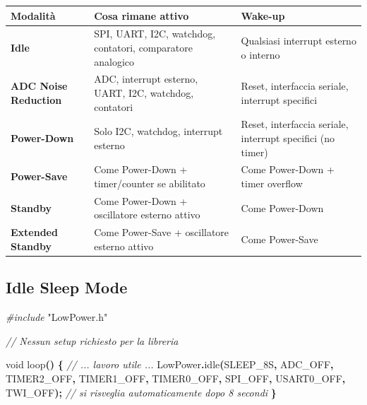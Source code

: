 \documentclass[
  italian,
  openany]{book}
\newenvironment{Shaded}{\begin{snugshade}}{\end{snugshade}}
\newcommand{\CommentTok}[1]{\textcolor[rgb]{0.56,0.35,0.01}{\textit{#1}}}
\newcommand{\DataTypeTok}[1]{\textcolor[rgb]{0.13,0.29,0.53}{#1}}
\newcommand{\ImportTok}[1]{#1}
\newcommand{\NormalTok}[1]{#1}
\newcommand{\OperatorTok}[1]{\textcolor[rgb]{0.81,0.36,0.00}{\textbf{#1}}}
\newcommand{\PreprocessorTok}[1]{\textcolor[rgb]{0.56,0.35,0.01}{\textit{#1}}}
\newcounter{none} %
\begin{document}
{\def\LTcaptype{none} %
\begin{longtable}[]{@{}
  >{\raggedright\arraybackslash}p{}
  >{\raggedright\arraybackslash}p{}
  >{\raggedright\arraybackslash}p{}@{}}
\toprule\noalign{}
\begin{minipage}[b]{\linewidth}\raggedright
Modalità
\end{minipage} & \begin{minipage}[b]{\linewidth}\raggedright
Cosa rimane attivo
\end{minipage} & \begin{minipage}[b]{\linewidth}\raggedright
Wake-up
\end{minipage} \\
\midrule\noalign{}
\endhead
\bottomrule\noalign{}
\endlastfoot
\textbf{Idle} & SPI, UART, I2C, watchdog, contatori, comparatore
analogico & Qualsiasi interrupt esterno o interno \\
\textbf{ADC Noise Reduction} & ADC, interrupt esterno, UART, I2C,
watchdog, contatori & Reset, interfaccia seriale, interrupt specifici \\
\textbf{Power-Down} & Solo I2C, watchdog, interrupt esterno & Reset,
interfaccia seriale, interrupt specifici (no timer) \\
\textbf{Power-Save} & Come Power-Down + timer/counter se abilitato &
Come Power-Down + timer overflow \\
\textbf{Standby} & Come Power-Down + oscillatore esterno attivo & Come
Power-Down \\
\textbf{Extended Standby} & Come Power-Save + oscillatore esterno attivo
& Come Power-Save \\
\end{longtable}
}

\subsection{Idle Sleep Mode}\label{idle-sleep-mode}

\begin{Shaded}
\begin{Highlighting}[]
\PreprocessorTok{\#include }\ImportTok{"LowPower.h"}

\CommentTok{// Nessun setup richiesto per la libreria}

\DataTypeTok{void}\NormalTok{ loop}\OperatorTok{()} \OperatorTok{\{}
  \CommentTok{// ... lavoro utile ...}
\NormalTok{  LowPower}\OperatorTok{.}\NormalTok{idle}\OperatorTok{(}\NormalTok{SLEEP\_8S}\OperatorTok{,}\NormalTok{ ADC\_OFF}\OperatorTok{,}\NormalTok{ TIMER2\_OFF}\OperatorTok{,}\NormalTok{ TIMER1\_OFF}\OperatorTok{,}
\NormalTok{                TIMER0\_OFF}\OperatorTok{,}\NormalTok{ SPI\_OFF}\OperatorTok{,}\NormalTok{ USART0\_OFF}\OperatorTok{,}\NormalTok{ TWI\_OFF}\OperatorTok{);}
  \CommentTok{// si risveglia automaticamente dopo 8 secondi}
\OperatorTok{\}}
\end{Highlighting}
\end{Shaded}
\end{document}
